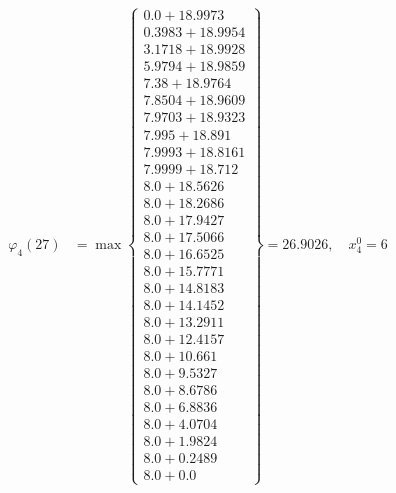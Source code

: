 \documentclass{article}
\begin{document}
\begin{align*}
\varphi_{4}(27) &= \max \left\{ \begin{array}{c}
0.0 + 18.9973 \\
 0.3983 + 18.9954 \\
 3.1718 + 18.9928 \\
 5.9794 + 18.9859 \\
 7.38 + 18.9764 \\
 7.8504 + 18.9609 \\
 7.9703 + 18.9323 \\
 7.995 + 18.891 \\
 7.9993 + 18.8161 \\
 7.9999 + 18.712 \\
 8.0 + 18.5626 \\
 8.0 + 18.2686 \\
 8.0 + 17.9427 \\
 8.0 + 17.5066 \\
 8.0 + 16.6525 \\
 8.0 + 15.7771 \\
 8.0 + 14.8183 \\
 8.0 + 14.1452 \\
 8.0 + 13.2911 \\
 8.0 + 12.4157 \\
 8.0 + 10.661 \\
 8.0 + 9.5327 \\
 8.0 + 8.6786 \\
 8.0 + 6.8836 \\
 8.0 + 4.0704 \\
 8.0 + 1.9824 \\
 8.0 + 0.2489 \\
 8.0 + 0.0
\end{array} \right\}=26.9026, \quad x_{4}^0=6\\
  

\end{align*}
\end{document}
